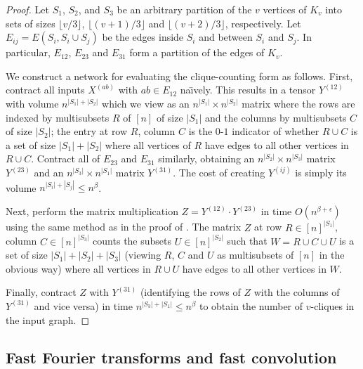 \begin{proof}
  Let $S_1$, $S_2$, and $S_3$ be an arbitrary partition of the $v$
  vertices of $K_v$ into sets of sizes $\lfloor v/3 \rfloor$, $\lfloor
  (v+1)/3 \rfloor$ and $\lfloor (v+2)/3 \rfloor$, respectively.
  Let $E_{ij} = E(S_i, S_i \cup S_j)$ be the edges inside $S_i$ and
  between $S_i$ and $S_j$.  In particular, $E_{12}$, $E_{23}$ and $E_{31}$
  form a partition of the edges of $K_v$.

  We construct a network for evaluating the clique-counting form as
  follows.  First, contract all inputs $X^{(ab)}$ with $ab \in E_{12}$
  na\"\i{}vely.  This results in a tensor $Y^{(12)}$ with volume $n^{|S_1|
    + |S_2|}$ which we view as an $n^{|S_1|} \times n^{|S_2|}$ matrix
  where the rows are indexed by multisubsets $R$ of $[n]$ of size $|S_1|$
  and the columns by multisubsets $C$ of size $|S_2|$; the entry at
  row $R$, column $C$ is the $0$-$1$ indicator of whether $R \cup C$ is
  a set of size $|S_1|+|S_2|$ where all vertices of $R$ have edges to
  all other vertices in $R \cup C$.
  Contract all of $E_{23}$ and
  $E_{31}$ similarly, obtaining an $n^{|S_2|} \times n^{|S_3|}$ matrix
  $Y^{(23)}$ and an $n^{|S_3|} \times n^{|S_1|}$ matrix $Y^{(31)}$.
  The cost of creating $Y^{(ij)}$ is simply its volume $n^{|S_i|+|S_j|} \le n^{\beta}$.

  Next, perform the matrix multiplication $Z = Y^{(12)} \cdot Y^{(23)}$ in
  time $O(n^{\beta + \epsilon})$ using the same method as in the proof
  of .  The matrix $Z$ at row $R
  \in [n]^{|S_1|}$, column $C \in [n]^{|S_3|}$ counts the 
%
  subsets $U\in [n]^{|S_2|}$ such that $W = R \cup C \cup U$ is a set of
  size $|S_1| + |S_2| + |S_3|$ (viewing $R$, $C$ and $U$ as multisubsets of
  $[n]$ in the obvious way) where all vertices in $R \cup U$ have
  edges to all other vertices in $W$.

  Finally, contract $Z$ with $Y^{(31)}$ (identifying the rows of
  $Z$ with the columns of $Y^{(31)}$ and vice versa) in time $n^{|S_3|
    + |S_1|} \le n^{\beta}$ to obtain the number of $v$-cliques in the
  input graph.
\end{proof}





\subsection{Fast Fourier transforms and fast convolution}

\label{sect:fft}

